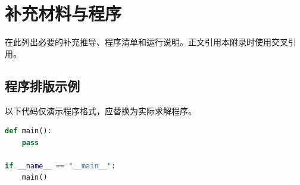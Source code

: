 \appendicesbegin
\section{补充材料与程序}
在此列出必要的补充推导、程序清单和运行说明。正文引用本附录时使用交叉引用。
\subsection{程序排版示例}
以下代码仅演示程序格式，应替换为实际求解程序。
\begin{lstlisting}[language=Python]
def main():
    pass

if __name__ == "__main__":
    main()
\end{lstlisting}

